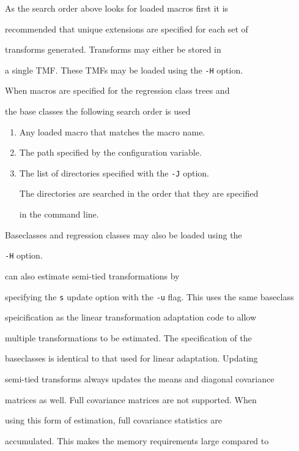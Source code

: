 As the search order above looks for loaded macros first it is 


recommended that unique extensions are specified for each set of


transforms generated. Transforms may either be stored in 


a single TMF. These TMFs may be loaded using the {\tt -H} option.


When macros are specified for the regression class trees and 


the base classes the following search order is used


\begin{enumerate}


\item Any loaded macro that matches the macro name.


\item The path specified by the configuration variable.


\item The list of directories specified with the {\tt -J} option.


The directories are searched in the order that they are specified


in the command line.


\end{enumerate}


Baseclasses and regression classes may also be loaded using the 


{\tt -H} option.





 can also estimate semi-tied transformations by


specifying the {\tt s} update option with the {\tt -u} flag. This uses the same baseclass


speicification as the linear transformation adaptation code to allow


multiple transformations to be estimated. The specification of the


baseclasses is identical to that used for linear adaptation. Updating


semi-tied transforms always updates the means and diagonal covariance


matrices as well.  Full covariance matrices are not supported. When


using this form of estimation, full covariance statistics are


accumulated. This makes the memory requirements large compared to


